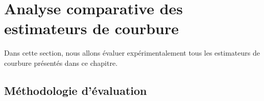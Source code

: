 
\section{Analyse comparative des estimateurs de courbure}%
\label{sec:comparaison-courbure}
%
Dans cette section, nous allons évaluer expérimentalement tous les estimateurs
de courbure présentés dans ce chapitre.
%
\subsection{Méthodologie d'évaluation}%
\label{sec:comparaison:methodologie}


